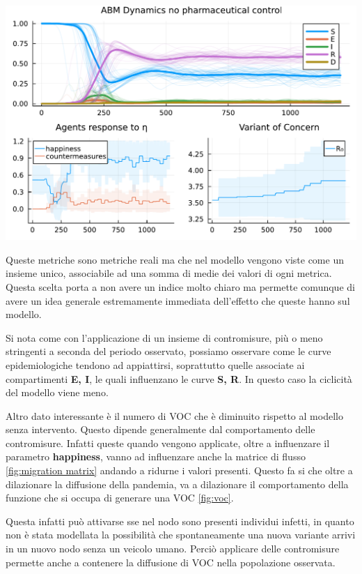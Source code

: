 \begin{minipage}{\linewidth}
	\centering
	\includegraphics[width=\textwidth]{img/SocialNetworkABM_CONTROL.pdf}
	\label{fig:abm_intervent}
\end{minipage}

Queste metriche sono metriche reali ma che nel modello vengono viste come un insieme unico, associabile 
ad una somma di medie dei valori di ogni metrica. Questa scelta porta a non avere un indice molto chiaro
ma permette comunque di avere un idea generale estremamente immediata dell'effetto che queste hanno sul modello.

Si nota come con l'applicazione di un insieme di contromisure, più o meno stringenti a seconda del periodo osservato, 
possiamo osservare come le curve epidemiologiche tendono ad appiattirsi, soprattutto quelle associate ai compartimenti 
\textbf{E, I}, le quali influenzano le curve \textbf{S, R}. In questo caso la ciclicità del modello viene meno. 

Altro dato interessante è il numero di VOC che è diminuito rispetto al modello senza intervento.
Questo dipende generalmente dal comportamento delle contromisure. Infatti queste quando vengono applicate, 
oltre a influenzare il parametro \textbf{happiness}, vanno ad influenzare anche la matrice di flusso \ref{fig:migration matrix}
andando a ridurne i valori presenti. Questo fa si che oltre a dilazionare la diffusione della pandemia, 
va a dilazionare il comportamento della funzione che si occupa di generare una VOC \ref{fig:voc}. 

Questa infatti può attivarse sse nel nodo sono presenti individui infetti, in quanto non è stata modellata la 
possibilità che spontaneamente una nuova variante arrivi in un nuovo nodo senza un veicolo umano. Perciò 
applicare delle contromisure permette anche a contenere la diffusione di VOC nella popolazione osservata.

